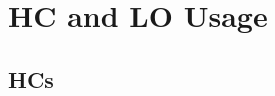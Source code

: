\chapter{HC and LO Usage} \label{app:hc_lo_usage}


\section{HCs}

\newcommand\hashtag{\item[\textbf{\#}]}
